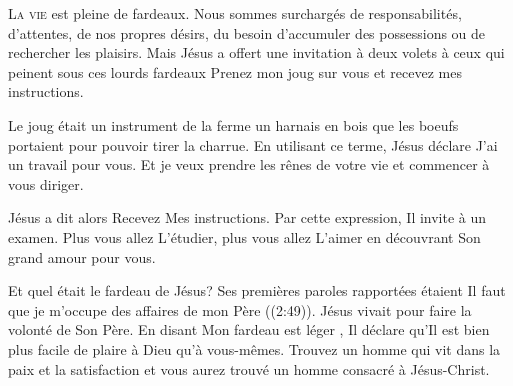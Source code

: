 

\lettrine{L}{a vie} est pleine de fardeaux.
 Nous sommes surchargés de responsabilités, d'attentes,
 de nos propres désirs, du besoin d'accumuler des possessions
 ou de rechercher les plaisirs.
 Mais Jésus a offert une invitation à deux volets à ceux
 qui peinent sous ces lourds fardeaux\frcolon{}
 \Og Prenez mon joug sur vous et recevez mes instructions. \Fg{}

Le joug était un instrument de la ferme \ocadr un harnais en bois
 que les boeufs portaient pour pouvoir tirer la charrue.
 En utilisant ce terme, Jésus déclare\frcolon{} 
 \Og J'ai un travail pour vous. Et je veux prendre les rênes
 de votre vie et commencer à vous diriger. \Fg{}


Jésus a dit alors\frcolon{}  \Og Recevez Mes instructions. \Fg{}
 Par cette expression, Il invite à un examen. Plus vous allez L'étudier,
 plus vous allez L'aimer en découvrant Son grand amour pour vous. 

Et quel était le fardeau de Jésus? Ses premières paroles rapportées
 étaient\frcolon{}  \Og Il faut que je m'occupe
 des affaires de mon Père \Fg{} ((2:49)).
 Jésus vivait pour faire la volonté de Son Père. En disant\frcolon{} 
 \Og Mon fardeau est léger \Fg{}, Il déclare qu'Il est bien plus facile
 de plaire à Dieu qu'à vous-mêmes.
 Trouvez un homme qui vit dans la paix et la satisfaction
 et vous aurez trouvé un homme consacré à Jésus-Christ. 

\dvrule




